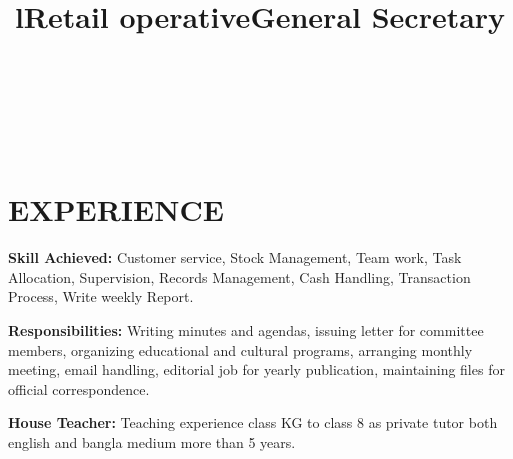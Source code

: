 \documentclass[margin]{res}
\begin{document}
\begin{resume}


\begin{format}
\title{l}\\
\\
\body\\
\end{format}

\section{EXPERIENCE}

\title{\textbf{Retail operative}}
\begin{position}
\textbf{Skill Achieved:}
Customer service, Stock Management, Team work, Task Allocation, Supervision, Records Management, Cash Handling, Transaction Process, Write weekly Report.
\end{position}

\title{\textbf{General Secretary}}
\begin{position}
\textbf{Responsibilities:}
Writing minutes and agendas, issuing letter for committee members, organizing educational and cultural programs, arranging monthly meeting, email handling, editorial job for yearly publication, maintaining files for official correspondence.
\end{position}

\textbf{House Teacher:} Teaching experience class KG to class 8 as private tutor both english and bangla medium more than 5 years.

  

\end{resume}
\end{document}

